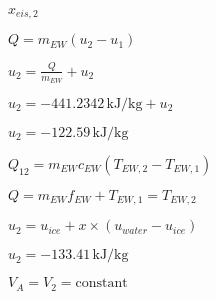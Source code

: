 \( x_{eis,2} \)  

\( Q = m_{EW} (u_2 - u_1) \)  

\( u_2 = \frac{Q}{m_{EW}} + u_2 \)  

\( u_2 = -441.2342 \, \text{kJ/kg} + u_2 \)  

\( u_2 = -122.59 \, \text{kJ/kg} \)  

\( Q_{12} = m_{EW} c_{EW} (T_{EW,2} - T_{EW,1}) \)  

\( Q = m_{EW} f_{EW} + T_{EW,1} = T_{EW,2} \)  

\( u_2 = u_{ice} + x \times (u_{water} - u_{ice}) \)  

\( u_2 = -133.41 \, \text{kJ/kg} \)  

\( V_A = V_2 = \text{constant} \)